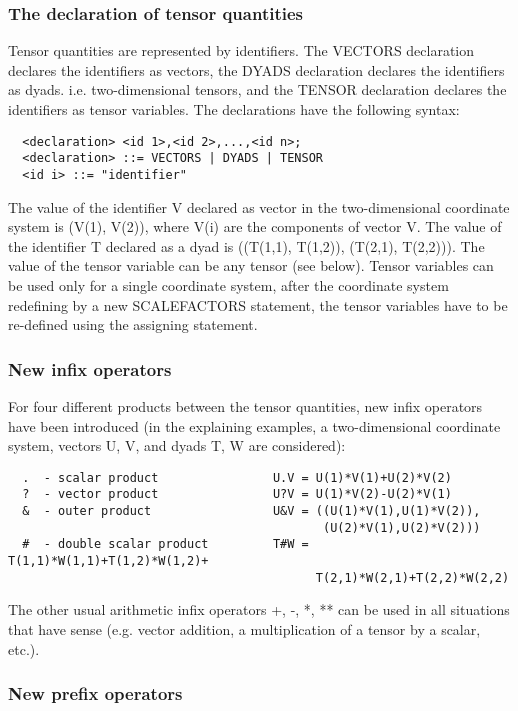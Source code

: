 \subsubsection{The declaration of tensor quantities}

     Tensor  quantities  are  represented  by  identifiers.  The VECTORS
declaration declares  the identifiers  as vectors, the DYADS declaration
declares the identifiers as dyads. i.e. two-dimensional tensors, and the
TENSOR  declaration  declares  the  identifiers as tensor variables. The
declarations have the following syntax:
\begin{verbatim}
  <declaration> <id 1>,<id 2>,...,<id n>;
  <declaration> ::= VECTORS | DYADS | TENSOR
  <id i> ::= "identifier"
\end{verbatim}
The value of the identifier V declared as vector in  the two-dimensional
coordinate  system  is  (V(1),  V(2)),  where V(i) are the components of
vector V. The value of the identifier T declared as a dyad  is ((T(1,1),
T(1,2)), (T(2,1),  T(2,2))). The value of the tensor variable can be any
tensor (see below). Tensor variables  can  be  used  only  for  a single
coordinate  system,  after  the  coordinate  system  redefining by a new
SCALEFACTORS statement, the tensor variables have to be re-defined using
the assigning statement.


\subsubsection{New infix operators}


     For  four  different  products  between  the tensor quantities, new
infix operators have been  introduced  (in  the  explaining  examples, a
two-dimensional  coordinate  system,  vectors  U,  V, and dyads T, W are
considered):
\begin{verbatim}
  .  - scalar product                U.V = U(1)*V(1)+U(2)*V(2)
  ?  - vector product                U?V = U(1)*V(2)-U(2)*V(1)
  &  - outer product                 U&V = ((U(1)*V(1),U(1)*V(2)),
                                            (U(2)*V(1),U(2)*V(2)))
  #  - double scalar product         T#W = T(1,1)*W(1,1)+T(1,2)*W(1,2)+
                                           T(2,1)*W(2,1)+T(2,2)*W(2,2)
\end{verbatim}
The other usual arithmetic infix operators +, -,  *, **  can be  used in
all situations  that have  sense (e.g. vector addition, a multiplication
of a tensor by a scalar, etc.).


\subsubsection{New prefix operators}

